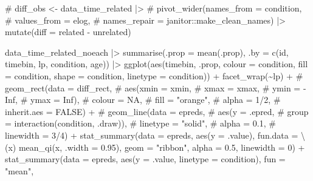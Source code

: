 \documentclass[
  letterpaper,
  DIV=11,
  numbers=noendperiod]{scrartcl}
\newenvironment{Shaded}{\begin{snugshade}}{\end{snugshade}}
\newcommand{\AttributeTok}[1]{\textcolor[rgb]{0.40,0.45,0.13}{#1}}
\newcommand{\CommentTok}[1]{\textcolor[rgb]{0.37,0.37,0.37}{#1}}
\newcommand{\DecValTok}[1]{\textcolor[rgb]{0.68,0.00,0.00}{#1}}
\newcommand{\FloatTok}[1]{\textcolor[rgb]{0.68,0.00,0.00}{#1}}
\newcommand{\FunctionTok}[1]{\textcolor[rgb]{0.28,0.35,0.67}{#1}}
\newcommand{\NormalTok}[1]{\textcolor[rgb]{0.00,0.23,0.31}{#1}}
\newcommand{\SpecialCharTok}[1]{\textcolor[rgb]{0.37,0.37,0.37}{#1}}
\newcommand{\StringTok}[1]{\textcolor[rgb]{0.13,0.47,0.30}{#1}}
\begin{document}
\begin{Shaded}
\begin{Highlighting}[]
\CommentTok{\# diff\_obs \textless{}{-} data\_time\_related |\textgreater{}}
\CommentTok{\#   pivot\_wider(names\_from = condition, }
\CommentTok{\#               values\_from = elog,}
\CommentTok{\#               names\_repair = janitor::make\_clean\_names) |\textgreater{} mutate(diff = related {-} unrelated)}

\NormalTok{data\_time\_related\_noeach }\SpecialCharTok{|\textgreater{}} 
    \FunctionTok{summarise}\NormalTok{(}\AttributeTok{.prop =} \FunctionTok{mean}\NormalTok{(.prop),}
              \AttributeTok{.by =} \FunctionTok{c}\NormalTok{(id, timebin, lp, condition, age)) }\SpecialCharTok{|\textgreater{}} 
    \FunctionTok{ggplot}\NormalTok{(}\FunctionTok{aes}\NormalTok{(timebin, .prop, }
               \AttributeTok{colour =}\NormalTok{ condition,}
               \AttributeTok{fill =}\NormalTok{ condition,}
               \AttributeTok{shape =}\NormalTok{ condition,}
               \AttributeTok{linetype =}\NormalTok{ condition)) }\SpecialCharTok{+}
    \FunctionTok{facet\_wrap}\NormalTok{(}\SpecialCharTok{\textasciitilde{}}\NormalTok{lp) }\SpecialCharTok{+}
    \CommentTok{\# geom\_rect(data = diff\_rect,}
    \CommentTok{\#         aes(xmin = xmin,}
    \CommentTok{\#           xmax = xmax,}
    \CommentTok{\#           ymin = {-}Inf,}
    \CommentTok{\#           ymax = Inf),}
    \CommentTok{\#         colour = NA,}
    \CommentTok{\#         fill = "orange",}
    \CommentTok{\#         alpha = 1/2,}
    \CommentTok{\#         inherit.aes = FALSE) +}
    \CommentTok{\# geom\_line(data = epreds,}
    \CommentTok{\#         aes(y = .epred,}
\CommentTok{\#           group = interaction(condition, .draw)),}
\CommentTok{\#         linetype = "solid",}
\CommentTok{\#         alpha = 0.1,}
\CommentTok{\#         linewidth = 3/4) +}
\FunctionTok{stat\_summary}\NormalTok{(}\AttributeTok{data =}\NormalTok{ epreds,}
             \FunctionTok{aes}\NormalTok{(}\AttributeTok{y =}\NormalTok{ .value),}
             \AttributeTok{fun.data =}\NormalTok{ \textbackslash{}(x) }\FunctionTok{mean\_qi}\NormalTok{(x, }\AttributeTok{.width =} \FloatTok{0.95}\NormalTok{),}
             \AttributeTok{geom =} \StringTok{"ribbon"}\NormalTok{,}
             \AttributeTok{alpha =} \FloatTok{0.5}\NormalTok{,}
             \AttributeTok{linewidth =} \DecValTok{0}\NormalTok{) }\SpecialCharTok{+}
    \FunctionTok{stat\_summary}\NormalTok{(}\AttributeTok{data =}\NormalTok{ epreds,}
                 \FunctionTok{aes}\NormalTok{(}\AttributeTok{y =}\NormalTok{ .value,}
                    \AttributeTok{linetype =}\NormalTok{ condition),}
                 \AttributeTok{fun =} \StringTok{"mean"}\NormalTok{,}

\end{Highlighting}
\end{Shaded}
\end{document}
